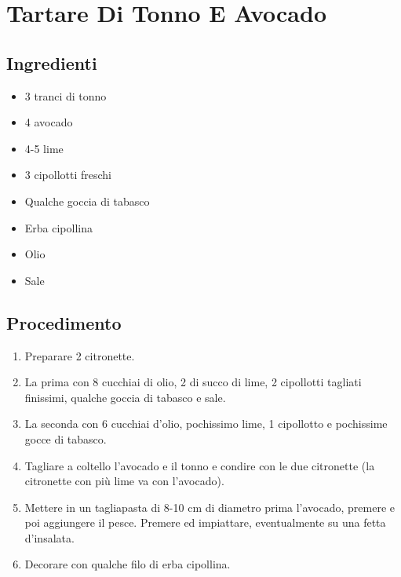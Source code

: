 \section{Tartare Di Tonno E Avocado}
\subsection{Ingredienti}
\begin{itemize}
\item 3 tranci di tonno  
\item 4 avocado  
\item 4-5 lime  
\item 3 cipollotti freschi  
\item Qualche goccia di tabasco  
\item Erba cipollina  
\item Olio  
\item Sale
\end{itemize}
\subsection{Procedimento}
\begin{enumerate}
\item  Preparare 2 citronette.   
\item  La prima con 8 cucchiai di olio, 2 di succo di lime, 2 cipollotti tagliati finissimi, qualche goccia di tabasco e sale.   
\item  La seconda con 6 cucchiai d'olio, pochissimo lime, 1 cipollotto e pochissime gocce di tabasco.  
\item  Tagliare a coltello l'avocado e il tonno e condire con le due citronette (la citronette con più lime va con l'avocado).  
\item  Mettere in un tagliapasta di 8-10 cm di diametro prima l'avocado, premere e poi aggiungere il pesce. Premere ed impiattare, eventualmente su una fetta d'insalata.  
\item  Decorare con qualche filo di erba cipollina.
\end{enumerate}
